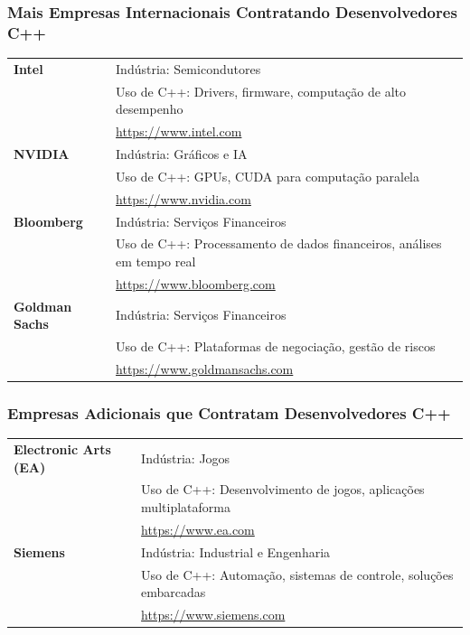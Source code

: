 \documentclass[aspectratio=169]{beamer}
\begin{document}
\begin{frame}
    \frametitle{Mais Empresas Internacionais Contratando Desenvolvedores C++}

    \small
    \begin{tabular}{p{} p{}}
        \textbf{Intel} & 
        Indústria: Semicondutores \\
        & Uso de C++: Drivers, firmware, computação de alto desempenho \\
        & \url{https://www.intel.com} \\ \hline
        
        \textbf{NVIDIA} & 
        Indústria: Gráficos e IA \\
        & Uso de C++: GPUs, CUDA para computação paralela \\
        & \url{https://www.nvidia.com} \\ \hline
        
        \textbf{Bloomberg} & 
        Indústria: Serviços Financeiros \\
        & Uso de C++: Processamento de dados financeiros, análises em tempo real \\
        & \url{https://www.bloomberg.com} \\ \hline
        
        \textbf{Goldman Sachs} & 
        Indústria: Serviços Financeiros \\
        & Uso de C++: Plataformas de negociação, gestão de riscos \\
        & \url{https://www.goldmansachs.com} \\
    \end{tabular}
\end{frame}

\begin{frame}
    \frametitle{Empresas Adicionais que Contratam Desenvolvedores C++}

    \small
    \begin{tabular}{p{} p{}}
        \textbf{Electronic Arts (EA)} & 
        Indústria: Jogos \\
        & Uso de C++: Desenvolvimento de jogos, aplicações multiplataforma \\
        & \url{https://www.ea.com} \\ \hline
        
        \textbf{Siemens} & 
        Indústria: Industrial e Engenharia \\
        & Uso de C++: Automação, sistemas de controle, soluções embarcadas \\
        & \url{https://www.siemens.com} \\
    \end{tabular}
\end{frame}
\end{document}
